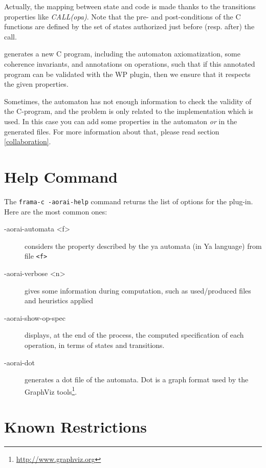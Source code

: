 \documentclass{frama-c-book}
\begin{document}
Actually, the mapping between state and code is made thanks to the
transitions properties like \emph{CALL(opa)}. Note that
the pre- and post-conditions of the C functions are defined by the set
of states authorized just before (resp. after) the call.

\aorai generates a new C program, including the automaton
axiomatization, some coherence invariants, and annotations on
operations, such that if this annotated program can be validated with
the WP plugin, then we ensure that it respects the given
properties.

Sometimes, the automaton has not enough information to check the
validity of the C-program, and the problem is only related to the
implementation which is used. In this case you can add some properties
in the automaton \emph{or} in the generated files. For more
information about that, please read section \ref{collaboration}.

\section{Help Command}\label{sec:help-command}

 The \texttt{frama-c -aorai-help} command returns the list of options for the
 \aorai plug-in. Here are the most common ones:
 \begin{description}
   \item[-aorai-automata <f>] considers the property described by the ya
     automata (in Ya language) from file \texttt{<f>}
   \item[-aorai-verbose <n>] gives some information during computation,
     such as used/produced files and heuristics applied
   \item[-aorai-show-op-spec] displays, at the end of the process, the computed specification of each operation, in terms of states and transitions.
   \item[-aorai-dot] generates a dot file of the automata.
     Dot is a graph format used by the
     GraphViz tools\footnote{\url{http://www.graphviz.org}}.

 \end{description}

\section{Known Restrictions}
\end{document}
